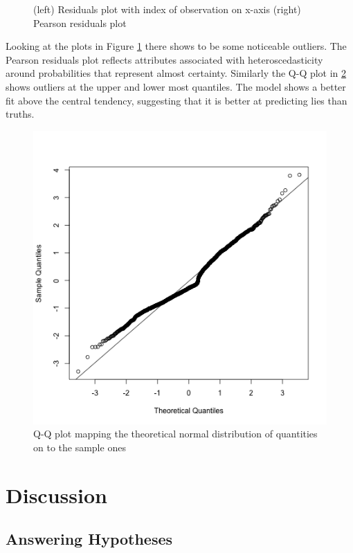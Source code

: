 \documentclass[man, floatsintext]{apa7}
\begin{document}
\begin{figure}[H]
	\caption{(left) Residuals plot with index of observation on x-axis (right) Pearson residuals plot}
	\label{fig:Residuals}
\end{figure}

Looking at the plots in Figure \ref{fig:Residuals} there shows to be some noticeable outliers. The Pearson residuals plot reflects attributes associated with heteroscedasticity around probabilities that represent almost certainty. Similarly the Q-Q plot in \ref{fig:qqline} shows outliers at the upper and lower most quantiles. The model shows a better fit above the central tendency, suggesting that it is better at predicting lies than truths.

\begin{figure}[H]
	\centering
	\includegraphics[width=0.5\linewidth]{../plots/R/qqline}
	\caption{Q-Q plot mapping the theoretical normal distribution of quantities on to the sample ones}
	\label{fig:qqline}
\end{figure}

\section{Discussion}




\subsection{Answering Hypotheses}
\end{document}
